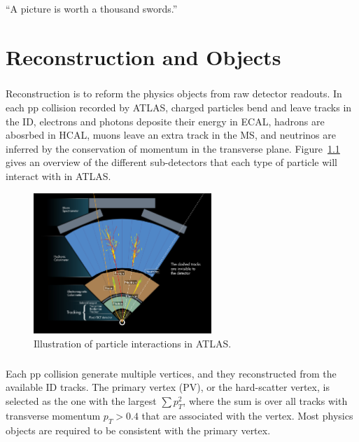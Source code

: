 \begin{savequote}[75mm]
“A picture is worth a thousand swords.”
\end{savequote}

\chapter{Reconstruction and Objects}

\paragraph{}
Reconstruction is to reform the physics objects from raw detector readouts. 
In each pp collision recorded by ATLAS, charged particles bend and leave tracks in the ID, electrons and photons deposite their energy in ECAL, hadrons are abosrbed in HCAL, muons leave an extra track in the MS, and neutrinos are inferred by the conservation of momentum in the transverse plane. 
Figure~\ref{fig:reco_overview} gives an overview of the different sub-detectors that each type of particle will interact with in ATLAS.

\begin{figure}[h!]
  \centering
  \captionsetup{justification=centering}
  \includegraphics[width=0.6\textwidth]{figures/detector/ATLAS_particle}
   \caption{Illustration of particle interactions in ATLAS.}
  \label{fig:reco_overview}
\end{figure}

\paragraph{}
Each pp collision generate multiple vertices, and they reconstructed from the available ID tracks. 
The primary vertex (PV), or the hard-scatter vertex, is selected as the one with the largest $\sum p_T^2$, where the sum is over all tracks with transverse momentum $p_T > 0.4$ \GeV that are associated with the vertex. 
Most physics objects are required to be consistent with the primary vertex.


